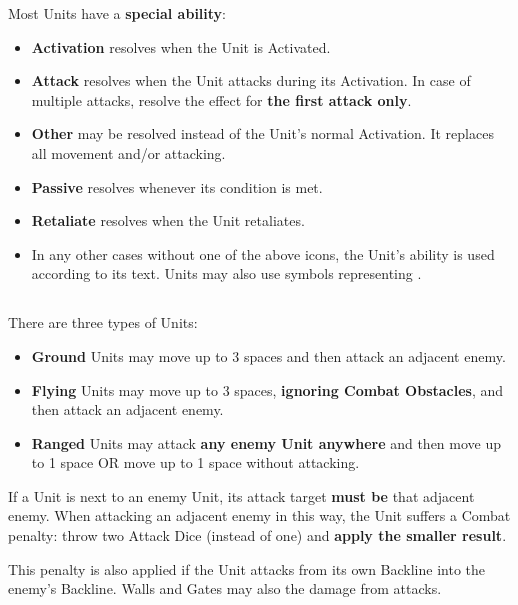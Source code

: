 \begin{multicols}{2}
\bigbreak

Most Units have a \textbf{special ability}:\par
\begin{itemize}[wide]
  \item\textbf{Activation}  resolves when the Unit is Activated.
  \item\textbf{Attack}  resolves when the Unit attacks during its Activation.
    In case of multiple attacks, resolve the effect for \textbf{the first attack only}.
  \item\textbf{Other}  may be resolved instead of the Unit's normal Activation.
    It replaces all movement and/or attacking.
  \item\textbf{Passive}  resolves whenever its condition is met.
  \item\textbf{Retaliate}  resolves when the Unit retaliates.
  \item In any other cases without one of the above icons, the Unit's ability is used according to its text.
    Units may also use symbols representing .
\end{itemize}

\vspace*{\fill}

\columnbreak

\subsection*{}
There are three types of Units:
\begin{itemize}
  \item \textbf{Ground}  Units may move up to 3 spaces and then attack an adjacent enemy.
  \item \textbf{Flying}  Units may move up to 3 spaces, \textbf{ignoring Combat Obstacles}, and then attack an adjacent enemy.
  \item \textbf{Ranged}  Units may attack \textbf{any enemy Unit anywhere} and then move up to 1 space OR move up to 1 space without attacking.
\end{itemize}
If a  Unit is next to an enemy Unit, its attack target \textbf{must be} that adjacent enemy.
When attacking an adjacent enemy in this way, the  Unit suffers a Combat penalty: throw two Attack Dice (instead of one) and \textbf{apply the smaller result}.\par
This penalty is also applied if the  Unit attacks from its own Backline into the enemy's Backline.
Walls and Gates may also  the damage from   attacks.


\end{multicols}
